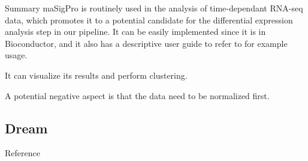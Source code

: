 \documentclass[10pt,a4paper]{article}
\newlength{\templength}
\newenvironment{ann_section}[1]
{\settowidth{\templength}{#1}%
\noindent\textbf{#1}
\hspace{1em}\begin{minipage}[t]{\dimexpr \linewidth-\the\templength-2em}}
{\end{minipage}\par\bigskip}
\begin{document}
\begin{ann_section}{Summary}
maSigPro is routinely used in the analysis of time-dependant RNA-seq data, which promotes it to a potential candidate for the differential expression analysis step in our pipeline.
It can be easily implemented since it is in Bioconductor, and it also has a descriptive user guide to refer to for example usage.

It can visualize its results and perform clustering.

A potential negative aspect is that the data need to be normalized first.
\end{ann_section}

\subsection{Dream}
\begin{ann_section}{Reference}
\mbox{}
\end{ann_section}
\end{document}
